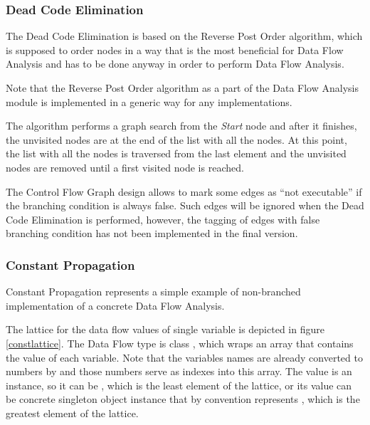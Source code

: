         \subsubsection*{Dead Code Elimination}
        
        The Dead Code Elimination is based on the Reverse Post Order 
        algorithm, which is supposed to order nodes in a way that 
        is the most beneficial for Data Flow Analysis and has to be 
        done anyway in order to perform Data Flow Analysis.
        
        Note that the Reverse Post Order algorithm as a part 
        of the Data Flow Analysis module is implemented 
        in a generic way for any  implementations. 
        
        The algorithm performs a graph search from the \emph{Start} 
        node and after it finishes, the unvisited nodes are 
        at the end of the list with all the nodes. At this point, 
        the list with all the nodes is traversed from the last 
        element and the unvisited nodes are removed until a 
        first visited node is reached.
        
        The Control Flow Graph design allows to mark 
        some edges as ``not executable'' if the branching 
        condition is always false. Such edges will be ignored 
        when the Dead Code Elimination is performed, however, 
        the tagging of edges with false branching condition 
        has not been implemented in the final version.
        
        \subsubsection*{Constant Propagation}
        Constant Propagation represents a simple example of non-branched 
        implementation of a concrete Data Flow Analysis. 
        
        The lattice for the data flow values of single variable is 
        depicted in figure \ref{constlattice}. The Data Flow type is class 
        , which wraps an array 
        that contains the value of each variable. Note 
        that the variables names are already converted to numbers by 
         and those numbers serve as indexes into this array.
        The value is an  instance, so it can be , which 
        is the least element of the lattice, or its value can be concrete 
        singleton object instance that by convention represents 
        , which is the greatest element of the lattice.
        

